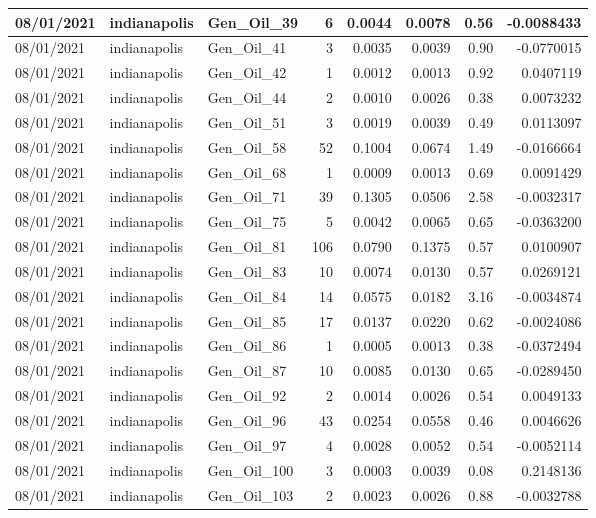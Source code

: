 \documentclass[
  letterpaper,
  DIV=11,
  numbers=noendperiod]{scrartcl}
\begin{document}
\begin{tabular}{l|l|l|r|r|r|r|r}
\hline
08/01/2021 & indianapolis & Gen\_Oil\_39 & 6 & 0.0044 & 0.0078 & 0.56 & -0.0088433\\
\hline
08/01/2021 & indianapolis & Gen\_Oil\_41 & 3 & 0.0035 & 0.0039 & 0.90 & -0.0770015\\
\hline
08/01/2021 & indianapolis & Gen\_Oil\_42 & 1 & 0.0012 & 0.0013 & 0.92 & 0.0407119\\
\hline
08/01/2021 & indianapolis & Gen\_Oil\_44 & 2 & 0.0010 & 0.0026 & 0.38 & 0.0073232\\
\hline
08/01/2021 & indianapolis & Gen\_Oil\_51 & 3 & 0.0019 & 0.0039 & 0.49 & 0.0113097\\
\hline
08/01/2021 & indianapolis & Gen\_Oil\_58 & 52 & 0.1004 & 0.0674 & 1.49 & -0.0166664\\
\hline
08/01/2021 & indianapolis & Gen\_Oil\_68 & 1 & 0.0009 & 0.0013 & 0.69 & 0.0091429\\
\hline
08/01/2021 & indianapolis & Gen\_Oil\_71 & 39 & 0.1305 & 0.0506 & 2.58 & -0.0032317\\
\hline
08/01/2021 & indianapolis & Gen\_Oil\_75 & 5 & 0.0042 & 0.0065 & 0.65 & -0.0363200\\
\hline
08/01/2021 & indianapolis & Gen\_Oil\_81 & 106 & 0.0790 & 0.1375 & 0.57 & 0.0100907\\
\hline
08/01/2021 & indianapolis & Gen\_Oil\_83 & 10 & 0.0074 & 0.0130 & 0.57 & 0.0269121\\
\hline
08/01/2021 & indianapolis & Gen\_Oil\_84 & 14 & 0.0575 & 0.0182 & 3.16 & -0.0034874\\
\hline
08/01/2021 & indianapolis & Gen\_Oil\_85 & 17 & 0.0137 & 0.0220 & 0.62 & -0.0024086\\
\hline
08/01/2021 & indianapolis & Gen\_Oil\_86 & 1 & 0.0005 & 0.0013 & 0.38 & -0.0372494\\
\hline
08/01/2021 & indianapolis & Gen\_Oil\_87 & 10 & 0.0085 & 0.0130 & 0.65 & -0.0289450\\
\hline
08/01/2021 & indianapolis & Gen\_Oil\_92 & 2 & 0.0014 & 0.0026 & 0.54 & 0.0049133\\
\hline
08/01/2021 & indianapolis & Gen\_Oil\_96 & 43 & 0.0254 & 0.0558 & 0.46 & 0.0046626\\
\hline
08/01/2021 & indianapolis & Gen\_Oil\_97 & 4 & 0.0028 & 0.0052 & 0.54 & -0.0052114\\
\hline
08/01/2021 & indianapolis & Gen\_Oil\_100 & 3 & 0.0003 & 0.0039 & 0.08 & 0.2148136\\
\hline
08/01/2021 & indianapolis & Gen\_Oil\_103 & 2 & 0.0023 & 0.0026 & 0.88 & -0.0032788\\

\end{tabular}
\end{document}
